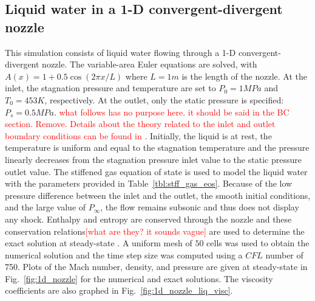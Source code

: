 \documentclass[preprint,10pt]{elsarticle}
\newcommand{\fig}[1]{Fig.~\ref{#1}}                      %
\newcommand{\tbl}[1]{Table~\ref{#1}}                     %
\newcommand{\tcr}[1]{\textcolor{red}{#1}}
\begin{document}
\subsection{Liquid water in a 1-D convergent-divergent nozzle} \label{sec:liquid_nozzle}

This simulation consists of liquid water flowing through a 1-D convergent-divergent nozzle. The variable-area Euler equations are solved, with $A(x) = 1 + 0.5 \cos(2 \pi x / L)$ where $L=1m$ is the length of the nozzle. At the inlet, the stagnation pressure and temperature are set to $P_0 = 1 MPa$ and $T_0 = 453 K$, respectively. At the outlet, only the static pressure is specified: $P_s = 0.5MPa$. 
\tcr{what follows has no purpose here. it should be said in the BC section. Remove. Details about the theory related to the inlet and outlet boundary conditions can be found in \cite{SEM}}. 
Initially, the liquid is at rest, the temperature is uniform and equal to the stagnation temperature and the pressure linearly decreases from the stagnation pressure inlet value to the static pressure outlet value. 
The stiffened gas equation of state is used to model the liquid water with the parameters provided in \tbl{tbl:stff_gas_eos}.
Because of the low pressure difference between the inlet and the outlet, the smooth initial conditions, and the large value of $P_\infty$, the flow remains subsonic and thus does not display any shock. Enthalpy and entropy are conserved through the nozzle and these conservation relations\tcr{[what are they? it sounds vague]} are used to determine the exact solution at steady-state \cite{nozzle_exact}. A uniform mesh of $50$ cells was used to obtain the numerical solution and the time step size was computed using a $CFL$ number of 750.
Plots of the Mach number, density, and pressure are given at steady-state in \fig{fig:1d_nozzle} for the numerical and exact solutions. The viscosity coefficients are also graphed in \fig{fig:1d_nozzle_liq_visc}. 
\end{document}
